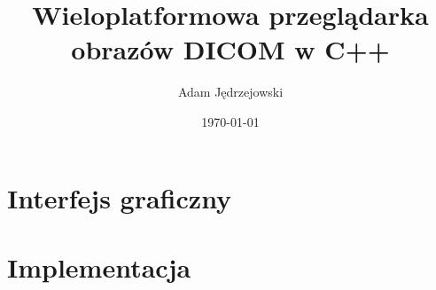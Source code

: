 \documentclass{article}
\author{Adam Jędrzejowski}
\title{Wieloplatformowa przeglądarka obrazów DICOM w C++}
\date{\today}
\begin{document}
\maketitle




\part{Interfejs graficzny}

\part{Implementacja}

\end{document}
